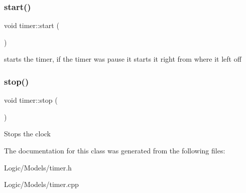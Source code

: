 \subsubsection{\texorpdfstring{start()}{start()}}
{\footnotesize\ttfamily void timer\+::start (\begin{DoxyParamCaption}{ }\end{DoxyParamCaption})}

starts the timer, if the timer was pause it starts it right from where it left off \mbox{\label{classtimer_a3218d61649e284071544b17c8c915ecc}} 
\subsubsection{\texorpdfstring{stop()}{stop()}}
{\footnotesize\ttfamily void timer\+::stop (\begin{DoxyParamCaption}{ }\end{DoxyParamCaption})}

Stops the clock 

The documentation for this class was generated from the following files\+:\begin{DoxyCompactItemize}
\item 
Logic/\+Models/timer.\+h\item 
Logic/\+Models/timer.\+cpp\end{DoxyCompactItemize}
